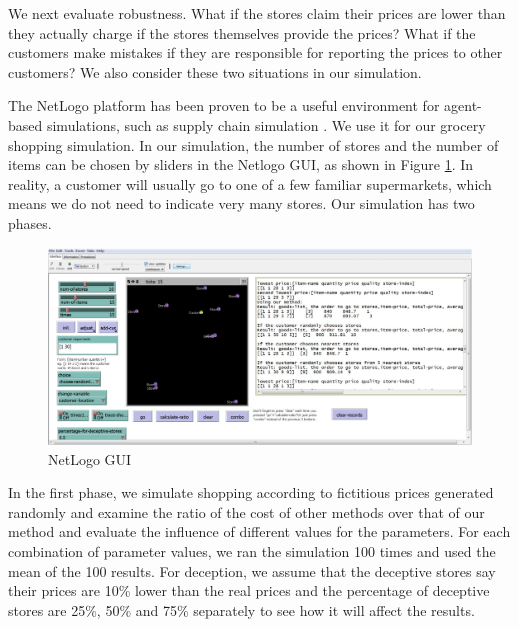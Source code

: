 We next evaluate robustness. What if the stores claim their prices are lower than they actually charge if the stores themselves provide the prices? What if the customers make mistakes if they are responsible for reporting the prices to other customers? We also consider these two situations in our simulation.

 
The NetLogo platform \cite{netlogo} has been proven to be a useful environment for agent-based simulations, such as supply chain simulation \cite{kawa2009}. We use it for our grocery shopping simulation. In our simulation, the number of stores and the number of items can be chosen by sliders in the Netlogo GUI, as shown in Figure \ref{ch2:fgui}. In reality, a customer will usually go to one of a few familiar supermarkets, which means we do not need to indicate very many stores. Our simulation has two phases.

\begin{figure}
\centering
\includegraphics[scale=0.35]{chap2/chap2-fig2.pdf}
\caption{NetLogo GUI}
\label{ch2:fgui}
\end{figure} 

In the first phase, we simulate shopping according to fictitious prices generated randomly and examine the ratio of the cost of other methods over that of our method and evaluate the influence of different values for the parameters. For each combination of parameter values, we ran the simulation 100 times and used the mean of the 100 results. For deception, we assume that the deceptive stores say their prices are 10\% lower than the real prices and the percentage of deceptive stores are 25\%, 50\% and 75\% separately to see how it will affect the results.

